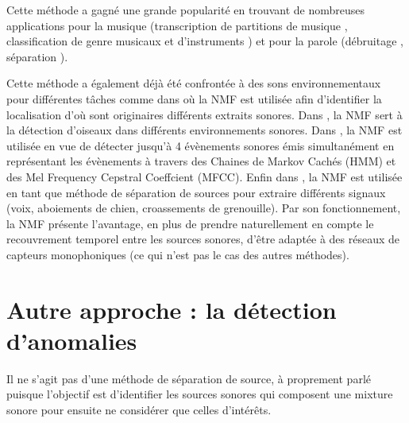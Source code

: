 Cette méthode a gagné une grande popularité en trouvant de nombreuses applications pour la musique (transcription de partitions de musique \cite{smaragdis_non-negative_2003,bertin2009tempering}, classification de genre musicaux \cite{panagakis2008music} et d'instruments \cite{benetos2006musical}) et pour la parole (débruitage \cite{wilson2008speech,sprechmann2014supervised}, séparation \cite{smaragdis2007convolutive,hurmalainen2012detection}).

Cette méthode a également déjà été confrontée à des sons environnementaux pour différentes tâches comme dans \cite{kumar2016audio} où la NMF est utilisée afin d'identifier la localisation d'où sont originaires différents extraits sonores. Dans \cite{sobieraj2017masked}, la NMF sert à la détection d'oiseaux dans différents environnements sonores. Dans \cite{heittola_sound_2011}, la NMF est utilisée en vue de détecter jusqu'à 4 évènements sonores émis simultanément en représentant les évènements à travers des Chaines de Markov Cachés (HMM) et des Mel Frequency Cepstral Coeffcient (MFCC).  Enfin dans \cite{satoshi_innami_nmf-based_2012}, la NMF est utilisée en tant que méthode de séparation de sources pour extraire différents signaux (voix, aboiements de chien, croassements de grenouille). 
Par son fonctionnement, la NMF présente l'avantage, en plus de prendre naturellement en compte le recouvrement temporel entre les sources sonores, d'être adaptée à des réseaux de capteurs monophoniques (ce qui n'est pas le cas des autres méthodes).

\section{Autre approche : la détection d'anomalies}

Il ne s'agit pas d'une méthode de séparation de source, à proprement parlé puisque l'objectif est d'identifier les sources sonores qui composent une mixture sonore pour ensuite ne considérer que celles d'intérêts.

